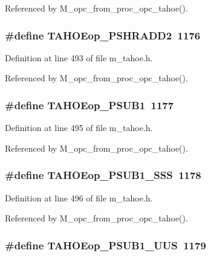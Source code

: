 Referenced by M\_\-opc\_\-from\_\-proc\_\-opc\_\-tahoe().
\subsubsection{\setlength{\rightskip}{0pt plus 5cm}\#define TAHOEop\_\-PSHRADD2~1176}\label{m__tahoe_8h_3bfb5bd69c85835e7ca128442345aaae}




Definition at line 493 of file m\_\-tahoe.h.

Referenced by M\_\-opc\_\-from\_\-proc\_\-opc\_\-tahoe().
\subsubsection{\setlength{\rightskip}{0pt plus 5cm}\#define TAHOEop\_\-PSUB1~1177}\label{m__tahoe_8h_46c412d0a56496232d924a180dcbdd51}




Definition at line 495 of file m\_\-tahoe.h.

Referenced by M\_\-opc\_\-from\_\-proc\_\-opc\_\-tahoe().
\subsubsection{\setlength{\rightskip}{0pt plus 5cm}\#define TAHOEop\_\-PSUB1\_\-SSS~1178}\label{m__tahoe_8h_e3285873ec6f7400d6372e1fea6bc6a7}




Definition at line 496 of file m\_\-tahoe.h.

Referenced by M\_\-opc\_\-from\_\-proc\_\-opc\_\-tahoe().
\subsubsection{\setlength{\rightskip}{0pt plus 5cm}\#define TAHOEop\_\-PSUB1\_\-UUS~1179}\label{m__tahoe_8h_e23df10c42057d5a4f818a8e58d0b6c4}





